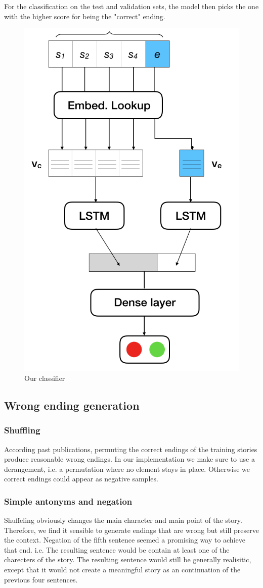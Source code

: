 \documentclass{article}
\begin{document}
For the classification on the test and validation sets, the model then picks the one with the higher score for being the "correct" ending.

\begin{figure}
  \centering
  \includegraphics[width=0.5 \linewidth]{fig/ourmodel.png}
  \caption{Our classifier}
  \label{Figure:model}
\end{figure}

\subsection{Wrong ending generation}

\subsubsection{Shuffling} According past publications\cite{top4}, permuting the correct endings of the training stories produce reasonable wrong endings. In our implementation we make sure to use a derangement, i.e. a permutation where no element stays in place. Otherwise we correct endings could appear as negative samples.

\subsubsection{Simple antonyms and negation}

Shuffeling obviously changes the main character and main point of the story. Therefore, we find it sensible to generate endings that are wrong but still preserve the context. Negation of the fifth sentence seemed a promising way to achieve that end. i.e. The resulting sentence would be contain at least one of the charecters of the story. The resulting sentence would still be generally realisitic, except that it would not create a meaningful story as an continuation of the previous four sentences. 
\end{document}
